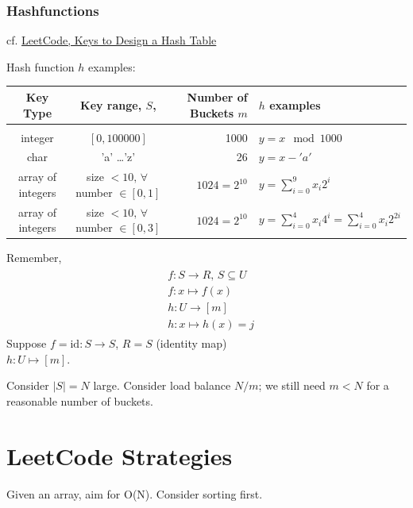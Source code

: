 \documentclass[10pt]{amsart}
\begin{document}
\begin{multicols*}{2}
\subsubsection{Hashfunctions}

cf. \href{https://leetcode.com/explore/learn/card/hash-table/182/practical-applications/1110/}{LeetCode, Keys to Design a Hash Table}

Hash function $h$ examples:

\begin{center}
	\begin{tabular}{ c  c  r  l }
		Key Type & Key range, $S$, & Number of Buckets $m$ & $h$ examples \\ \hline \\
		integer & $[0, 100000]$ & 1000 & $y = x \mod{1000} $ \\
		char & 'a' \dots 'z' & 26 & $ y = x - 'a'$ \\ 
		array of integers & size $< 10, \, \forall \,$ number $\in [0,1]$ & $1024=2^{10}$ & $ y = \sum_{i=0}^9 x_i 2^i$ \\
		array of integers & size $< 10, \, \forall \, $ number $\in [0,3 ]$ & $1024 = 2^{10}$ & $y = \sum_{i=0}^4 x_i 4^i = \sum_{i=0}^4 x_i 2^{2i}$ 
	\end{tabular}
\end{center}

Remember,
\begin{equation}
\boxed{
\begin{gathered}
	\begin{aligned}
	& f:S \to R, \, S \subseteq U \\ 
	& f:x \mapsto f(x) \\
	& h:U\to [m] \\ 
	& h:x \mapsto h(x) = j
	\end{aligned}
\end{gathered} }
\end{equation}
Suppose $f= \text{id}: S \to S$, $R=S$ (identity map) \\
$h:U \mapsto [m] $.

Consider $|S| = N$ large. Consider load balance $N/m $; we still need $m < N$ for a reasonable number of buckets.

\section{LeetCode Strategies}

Given an array, aim for O(N). Consider sorting first.


\end{multicols*}
\end{document}

